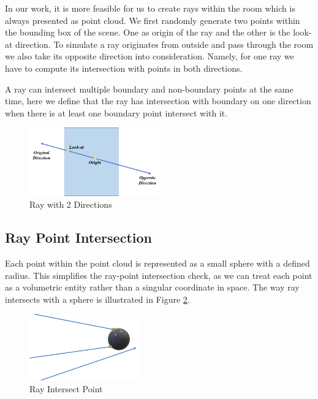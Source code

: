 \documentclass[11pt, a4paper,oneside,chapterprefix=false]{scrbook}
\begin{document}
\vspace{10pt}

In our work, it is more feasible for us to create rays within the room which is always presented as point cloud. We first randomly generate two points within the bounding box of the scene. One as origin of the ray and the other is the look-at direction. To simulate a ray originates from outside and pass through the room we also take its opposite direction into consideration. Namely, for one ray we have to compute its intersection with points in both directions. 

\vspace{10pt}

A ray can intersect multiple boundary and non-boundary points at the same time, here we define that the ray has intersection with boundary on one direction when there is at least one boundary point intersect with it.

\begin{figure}[H]
    \centering
    \includegraphics*[width=0.5\textwidth]{figures/ray with two directions.png}
    \caption{Ray with 2 Directions}
    \label{fig:ray with 2 directions}
\end{figure}

\subsection{Ray Point Intersection} \label{ray point intersection}

Each point within the point cloud is represented as a small sphere with a defined radius. This simplifies the ray-point intersection check, as we can treat each point as a volumetric entity rather than a singular coordinate in space. The way ray intersects with a sphere is illustrated in Figure \ref{fig:ray intersect point}. 

\begin{figure}[H]
    \centering
    \includegraphics*[width=0.42\textwidth]{figures/ray intersect point.png}
    \caption{Ray Intersect Point}
    \label{fig:ray intersect point}
\end{figure}
\end{document}
